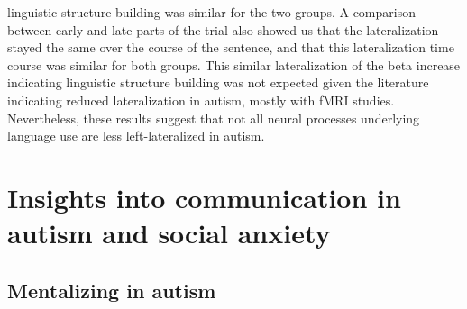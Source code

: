 linguistic structure building was similar for the two groups. A comparison between early and late parts of the trial also showed us that the lateralization stayed the same over the course of the sentence, and that this lateralization time course was similar for both groups. This similar lateralization of the beta increase indicating linguistic structure building was not expected given the literature indicating reduced lateralization in autism, mostly with fMRI studies. Nevertheless, these results suggest that not all neural processes underlying language use are less left-lateralized in autism.  

\section{Insights into communication in autism and social anxiety}

\subsection{Mentalizing in autism}


